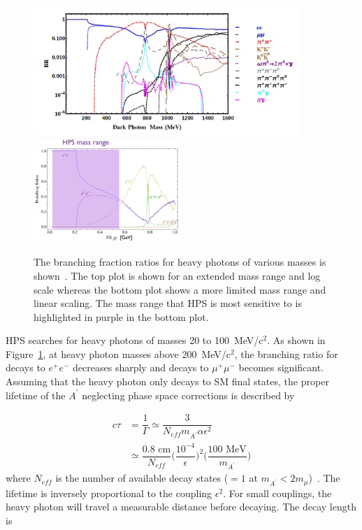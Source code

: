 \begin{figure}[htb]
  \centering
      \includegraphics[width=0.9\textwidth]{pics/motivation/branchingRatio.png}
 	 \includegraphics[width=0.5\textwidth]{pics/motivation/branchingLinear.png}	
  \caption[The branching fraction ratios for heavy photon decays]{The branching fraction ratios for heavy photons of various masses is shown~\cite{liu_signals_2015}. The top plot is shown for an extended mass range and log scale whereas the bottom plot shows a more limited mass range and linear scaling. The mass range that HPS is most sensitive to is highlighted in purple in the bottom plot.}
  \label{Figure:br}
\end{figure}

HPS searches for heavy photons of masses 20 to 100~MeV/c$^2$. As shown in Figure~\ref{Figure:br}, at heavy photon masses above 200~MeV/c$^2$, the branching ratio for decays to $e^+e^-$ decreases sharply and decays to $\mu^+\mu^-$ becomes significant. \\
\indent Assuming that the heavy photon only decays to SM final states, the proper lifetime of the $A^{\prime}$ neglecting phase space corrections is described by   

\begin{equation}
	\label{eq:propLife}
	\begin{split}
	c\tau &= \dfrac{1}{\Gamma}\simeq \dfrac{3}{N_{eff}m_{A^{\prime}}\alpha\epsilon^2}\\
	&\simeq \dfrac{0.8\textrm{ cm}}{N_{eff}}\Big({\dfrac{10^{-4}}{\epsilon}}\Big)^2\Big(\dfrac{100\textrm{ MeV}}{m_{A^{\prime}}}\Big)
	\end{split}
\end{equation}
where $N_{eff}$ is the number of available decay states ($=1$ at $m_{A^{\prime}}<2m_{\mu}$)~\cite{bjorken_new_2009}. The lifetime is inversely proportional to the coupling $\epsilon^2$. For small couplings, the heavy photon will travel a measurable distance before decaying. The decay length is 

